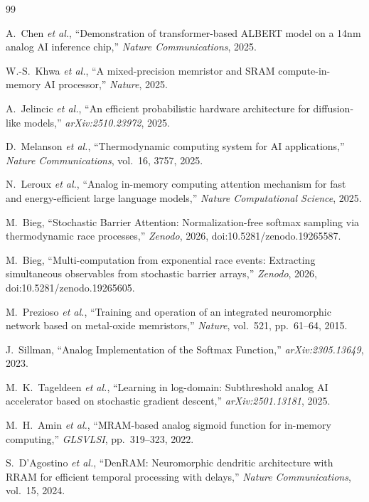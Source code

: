\documentclass[11pt]{article}
\begin{document}
\begin{thebibliography}{99}

 A.~Chen \textit{et al.}, ``Demonstration of transformer-based ALBERT model on a 14nm analog AI inference chip,'' \textit{Nature Communications}, 2025.

 W.-S.~Khwa \textit{et al.}, ``A mixed-precision memristor and SRAM compute-in-memory AI processor,'' \textit{Nature}, 2025.

 A.~Jelincic \textit{et al.}, ``An efficient probabilistic hardware architecture for diffusion-like models,'' \textit{arXiv:2510.23972}, 2025.

 D.~Melanson \textit{et al.}, ``Thermodynamic computing system for AI applications,'' \textit{Nature Communications}, vol.~16, 3757, 2025.

 N.~Leroux \textit{et al.}, ``Analog in-memory computing attention mechanism for fast and energy-efficient large language models,'' \textit{Nature Computational Science}, 2025.

 M.~Bieg, ``Stochastic Barrier Attention: Normalization-free softmax sampling via thermodynamic race processes,'' \textit{Zenodo}, 2026, doi:10.5281/zenodo.19265587.

 M.~Bieg, ``Multi-computation from exponential race events: Extracting simultaneous observables from stochastic barrier arrays,'' \textit{Zenodo}, 2026, doi:10.5281/zenodo.19265605.

 M.~Prezioso \textit{et al.}, ``Training and operation of an integrated neuromorphic network based on metal-oxide memristors,'' \textit{Nature}, vol.~521, pp.~61--64, 2015.

 J.~Sillman, ``Analog Implementation of the Softmax Function,'' \textit{arXiv:2305.13649}, 2023.

 M.~K.~Tageldeen \textit{et al.}, ``Learning in log-domain: Subthreshold analog AI accelerator based on stochastic gradient descent,'' \textit{arXiv:2501.13181}, 2025.

 M.~H.~Amin \textit{et al.}, ``MRAM-based analog sigmoid function for in-memory computing,'' \textit{GLSVLSI}, pp.~319--323, 2022.

 S.~D'Agostino \textit{et al.}, ``DenRAM: Neuromorphic dendritic architecture with RRAM for efficient temporal processing with delays,'' \textit{Nature Communications}, vol.~15, 2024.


\end{thebibliography}
\end{document}

